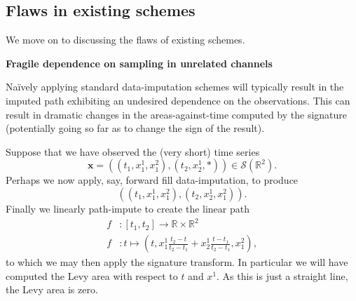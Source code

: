 \documentclass{article}
\renewcommand{\subsubsection}[1]{\textbf{#1}

} %
\newcommand{\reals}{\mathbb{R}}
\newcommand{\seriesspace}{\mathcal{S}}
\begin{document}
\subsection{Flaws in existing schemes}\label{section:flaws}
We move on to discussing the flaws of existing schemes.

\subsubsection{Fragile dependence on sampling in unrelated channels}
Na{\"i}vely applying standard data-imputation schemes will typically result in the imputed path exhibiting an undesired dependence on the observations. This can result in dramatic changes in the areas-against-time computed by the signature (potentially going so far as to change the sign of the result).

Suppose that we have observed the (very short) time series
\begin{equation}\label{eq:flaw1}
    \mathbf{x} = ((t_1, x_1^1, x_1^2), (t_2, x_2^1, *)) \in \seriesspace(\reals^2).
\end{equation}
Perhaps we now apply, say, forward fill data-imputation, to produce
\begin{equation*}
    ((t_1, x_1^1, x_1^2), (t_2, x_2^1, x_1^2)).
\end{equation*}
Finally we linearly path-impute to create the linear path
\begin{align*}
    f &\colon [t_1, t_2] \to \reals \times \reals^2\\
    f &\colon t \mapsto (t, x_1^1\frac{t_2 - t}{t_2 - t_1} + x_2^1\frac{t - t_1}{t_2 - t_1}, x_1^2),
\end{align*}
to which we may then apply the signature transform. In particular we will have computed the Levy area with respect to $t$ and $x^1$. As this is just a straight line, the Levy area is zero.
\end{document}
